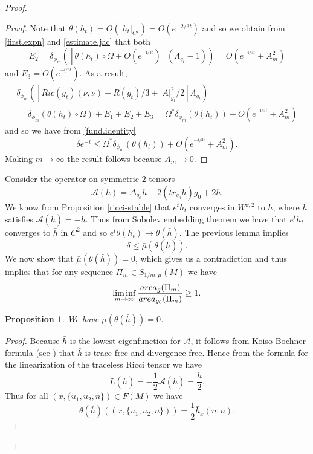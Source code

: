 \documentclass[11pt]{amsart}
\newtheorem{prop}[thm]{Proposition}
\theoremstyle{remark}
\theoremstyle{definition}
\begin{document}
{{\begin{proof}
\begin{proof}
			Note that  $\theta(h_t)=O(|h_t|_{C^2})=O(e^{-2/3t})$ and so we obtain from \eqref{first.expn} and  \eqref{estimate.jac} that both
			$$ E_2=\delta_{\phi_m}([\theta(h_t)\circ\Omega+O(e^{^{-4/3t}})](\Lambda_{g_t}-1))=O(e^{^{-4/3t}}+A_m^2)$$
			and $E_3=O(e^{^{-4/3t}})$. As a result, 
			\begin{multline*}
				\delta_{\phi_m}\left(\left[Ric(g_t)(\nu,\nu)-{R(g_t)/3}+{|A|^2_{g_t}}/{2}\right]\Lambda_{g_t}\right)\\
				=\delta_{\phi_m}(\theta(h_t)\circ\Omega)+E_1+E_2+E_3=\Omega^*\delta_{\phi_m}(\theta(h_t))+O(e^{^{-4/3t}}+A_m^2)
			\end{multline*}
			and so we have from \eqref{fund.identity}
			$$\delta e^{-t}\leq  \Omega^*\delta_{\phi_m}(\theta(h_t))+O(e^{^{-4/3t}}+A_m^2).$$
			Making $m\to\infty$ the result follows because $A_m\to 0$.
		\end{proof}
		
		
		{Consider the operator on symmetric $2$-tensors 
			\begin{equation}\label{deturck}
				\mathcal A(h)=\Delta_{g_0} h-2(tr_{g_0}h )g_0+2h.
		\end{equation}}
		We know from Proposition \ref{ricci-stable} that $e^th_t$ converges in {$W^{k,2}$} to $\bar h$, where $\bar h$ satisfies $\mathcal A(\bar h)=-\bar h$. Thus  from Sobolev embedding theorem we have that $e^th_t$ converges to $\bar h$ in {$C^2$} and so $e^t\theta(h_t)\to \theta (\bar h)$. The previous lemma implies
		$$
		\delta\leq \bar\mu(\theta(\bar h)).
		$$
		We now show that $\bar \mu(\theta(\bar h))=0$, which gives us a contradiction and thus implies that for any sequence  $\Pi_m\in {S_{1/m,\bar\mu}}(M)$ we have
		$$\liminf_{m\to\infty}\frac{{\rm area}_g(\Pi_m)}{{\rm area}_{g_0}(\Pi_m)}\geq 1.$$
		
		
		\begin{prop}\label{ergodic}{We have $\bar \mu(\theta(\bar h))=0$}.
		\end{prop}
		\begin{proof}
			Because $\bar h$ is the lowest eigenfunction for $\mathcal A$, it follows from Koiso Bochner formula (see \cite{knopf}) that $\bar h$ is trace free and divergence free. Hence from the formula for the linearization of the  traceless Ricci tensor \cite[Theorem 1.174]{besse} we have
			$$L(\bar h)=-\frac{1}{2}\mathcal A(\bar h)=\frac{{\bar h}}{2}.$$
			Thus for all $(x,\{u_1,u_2,n\}) \in F(M)$ we have 
			\begin{equation}\label{theta.formula}
				\theta(\bar h)((x,\{u_1,u_2,n\}))=\frac{1}{2}\bar h_{x}(n,n).
			\end{equation}
			

\end{proof}
\end{proof}}}
\end{document}
